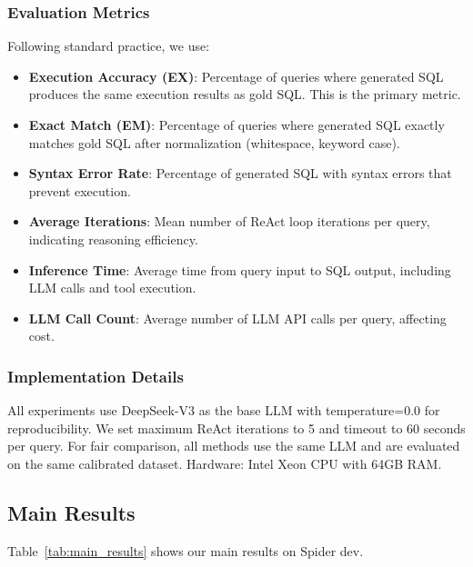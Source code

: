 \subsubsection{Evaluation Metrics}

Following standard practice, we use:

\begin{itemize}
    \item \textbf{Execution Accuracy (EX)}: Percentage of queries where generated SQL produces the same execution results as gold SQL. This is the primary metric.
    
    \item \textbf{Exact Match (EM)}: Percentage of queries where generated SQL exactly matches gold SQL after normalization (whitespace, keyword case).
    
    \item \textbf{Syntax Error Rate}: Percentage of generated SQL with syntax errors that prevent execution.
    
    \item \textbf{Average Iterations}: Mean number of ReAct loop iterations per query, indicating reasoning efficiency.
    
    \item \textbf{Inference Time}: Average time from query input to SQL output, including LLM calls and tool execution.
    
    \item \textbf{LLM Call Count}: Average number of LLM API calls per query, affecting cost.
\end{itemize}

\subsubsection{Implementation Details}

All experiments use DeepSeek-V3 as the base LLM with temperature=0.0 for reproducibility. We set maximum ReAct iterations to 5 and timeout to 60 seconds per query. For fair comparison, all methods use the same LLM and are evaluated on the same calibrated dataset. Hardware: Intel Xeon CPU with 64GB RAM.

\subsection{Main Results}

Table~\ref{tab:main_results} shows our main results on Spider dev.

